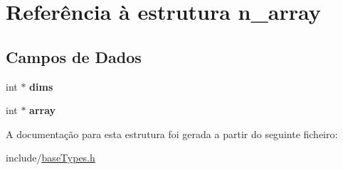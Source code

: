 \hypertarget{structn__array}{}\section{Referência à estrutura n\+\_\+array}
\label{structn__array}
\subsection*{Campos de Dados}
\begin{DoxyCompactItemize}
\item 
\mbox{\label{structn__array_a87c94199251d7ab8daf6870960bf61c2}} 
int $\ast$ {\bfseries dims}
\item 
\mbox{\label{structn__array_aeb0cc650d775c11f48315cef8e3834de}} 
int $\ast$ {\bfseries array}
\end{DoxyCompactItemize}


A documentação para esta estrutura foi gerada a partir do seguinte ficheiro\+:\begin{DoxyCompactItemize}
\item 
include/\hyperlink{baseTypes_8h}{base\+Types.\+h}\end{DoxyCompactItemize}

